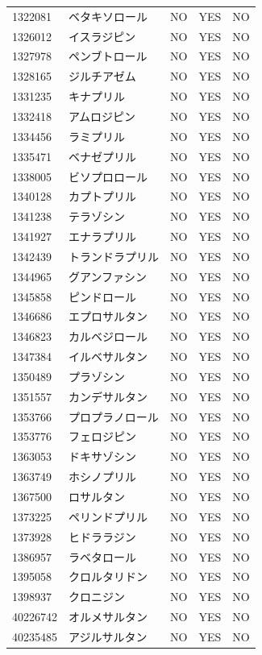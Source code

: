 \documentclass[
  11pt]{book}
\theoremstyle{definition}
\theoremstyle{definition}
\theoremstyle{definition}
\theoremstyle{definition}
\theoremstyle{remark}
\begin{document}
\begin{longtable}[]{@{}lllll@{}}
1322081 & ベタキソロール & NO & YES & NO \\
1326012 & イスラジピン & NO & YES & NO \\
1327978 & ペンブトロール & NO & YES & NO \\
1328165 & ジルチアゼム & NO & YES & NO \\
1331235 & キナプリル & NO & YES & NO \\
1332418 & アムロジピン & NO & YES & NO \\
1334456 & ラミプリル & NO & YES & NO \\
1335471 & ベナゼプリル & NO & YES & NO \\
1338005 & ビソプロロール & NO & YES & NO \\
1340128 & カプトプリル & NO & YES & NO \\
1341238 & テラゾシン & NO & YES & NO \\
1341927 & エナラプリル & NO & YES & NO \\
1342439 & トランドラプリル & NO & YES & NO \\
1344965 & グアンファシン & NO & YES & NO \\
1345858 & ピンドロール & NO & YES & NO \\
1346686 & エプロサルタン & NO & YES & NO \\
1346823 & カルベジロール & NO & YES & NO \\
1347384 & イルベサルタン & NO & YES & NO \\
1350489 & プラゾシン & NO & YES & NO \\
1351557 & カンデサルタン & NO & YES & NO \\
1353766 & プロプラノロール & NO & YES & NO \\
1353776 & フェロジピン & NO & YES & NO \\
1363053 & ドキサゾシン & NO & YES & NO \\
1363749 & ホシノプリル & NO & YES & NO \\
1367500 & ロサルタン & NO & YES & NO \\
1373225 & ペリンドプリル & NO & YES & NO \\
1373928 & ヒドララジン & NO & YES & NO \\
1386957 & ラベタロール & NO & YES & NO \\
1395058 & クロルタリドン & NO & YES & NO \\
1398937 & クロニジン & NO & YES & NO \\
40226742 & オルメサルタン & NO & YES & NO \\
40235485 & アジルサルタン & NO & YES & NO \\
\end{longtable}
\end{document}
